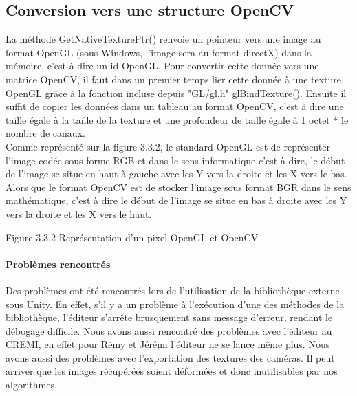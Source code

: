\documentclass[12pt,a4paper]{report}
\begin{document}
\subsection{Conversion vers une structure OpenCV}
La méthode GetNativeTexturePtr() renvoie un pointeur vers une image au format OpenGL (sous Windows, l'image sera au format directX) dans la mémoire, c'est à dire un id OpenGL. Pour convertir cette donnée vers une matrice OpenCV, il faut dans un premier temps lier cette donnée à une texture OpenGL grâce à la fonction incluse depuis "GL/gl.h" glBindTexture(). Ensuite il suffit de copier les données dans un tableau au format OpenCV, c'est à dire une taille égale à la taille de la texture et une profondeur de taille égale à 1 octet * le nombre de canaux.\\
Comme représenté sur la figure 3.3.2, le standard OpenGL est de représenter l'image codée sous forme RGB et dans le sens informatique c'est à dire, le début de l'image se situe en haut à gauche avec les Y vers la droite et les X vers le bas. Alors que le format OpenCV est de stocker l'image sous format BGR dans le sens mathématique, c'est à dire le début de l'image se situe en bas à droite avec les Y vers la droite et les X vers le haut.\\

\begin{center}

Figure 3.3.2 Représentation d'un pixel OpenGL et OpenCV
\end{center}

\paragraph{Problèmes rencontrés}
Des problèmes ont été rencontrés lors de l'utilisation de la bibliothèque externe sous Unity. En effet, s'il y a un problème à l'exécution d'une des méthodes de la bibliothèque, l'éditeur s'arrête brusquement sans message d'erreur, rendant le débogage difficile. Nous avons aussi rencontré des problèmes avec l'éditeur au CREMI, en effet pour Rémy et Jérémi l'éditeur ne se lance même plus. Nous avons aussi des problèmes avec l'exportation des textures des caméras. Il peut arriver que les images récupérées soient déformées et donc inutilisables par nos algorithmes.
\end{document}
